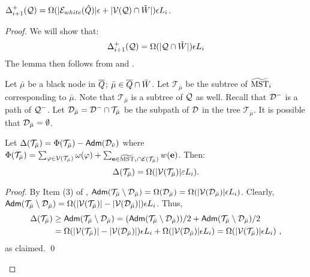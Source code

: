 \begin{lemma} $	\Delta^+_{i+1}(\mathcal{Q}) =  \Omega(|\mathcal{E}_{white}(\hat{Q})|\epsilon + |\mathcal{V}(\mathcal{Q})\cap \tilde{W}|)\epsilon L_i$.
\end{lemma}
\begin{proof} We will show that:
	 \begin{equation}\label{eq:blacknodes-C}
	 \Delta^+_{i+1}(\mathcal{Q}) =  \Omega(|\mathcal{Q} \cap \tilde{W}|) \epsilon L_i
	 \end{equation}
	 The lemma then follows from  and .
	 
	 Let $\bar{\mu}$ be a black node in $\overline{Q}$; $\bar{\mu}\in \overline{Q}\cap \bar{W}$. Let $\mathcal{T}_{\bar{\mu}}$ be the subtree of $\widetilde{\mathrm{MST}}_{i}$ corresponding to $\bar{\mu}$. Note that $\mathcal{T}_{\bar{\mu}}$ is a subtree of $\mathcal{Q}$ as well. Recall that $\mathcal{D}^-$ is a path of  $\mathcal{Q}^-$. Let $\mathcal{D}_{\bar{\mu}} = \mathcal{D}^{-} \cap \mathcal{T}_{\bar{\mu}}$ be the subpath of $\mathcal{D}$ in the tree $\mathcal{T}_{\bar{\mu}}$. It is possible that $\mathcal{D}_{\bar{\mu}} = \emptyset$. 
	 \begin{claim}\label{clm:Tmu-delta} Let $\Delta(\mathcal{T}_{\bar{\mu}}) = \Phi(\mathcal{T}_{\bar{\mu}}) - \mathsf{Adm}(\mathcal{D}_{\bar{\nu}})$ where $\Phi(\mathcal{T}_{\bar{\mu}})  = \sum_{\varphi \in \mathcal{V}(\mathcal{T}_{\bar{\mu}})}\omega(\varphi) + \sum_{\mathbf{e} \in \widetilde{\mathrm{MST}}_i\cap \mathcal{E}(\mathcal{T}_{\bar{\mu}})}w(\mathbf{e})$. Then:
	 	$$\Delta(\mathcal{T}_{\bar{\mu}}) = \Omega(| \mathcal{V}(\mathcal{T}_{\bar{\mu}})|\varepsilon L_i).$$
	 \end{claim}
 	\begin{proof}
 		By Item (3) of ,  $\mathsf{Adm}(\mathcal{T}_{\bar{\mu}} \setminus \mathcal{D}_{\bar{\mu}}) = \Omega( \mathcal{D}_{\bar{\mu}}) = \Omega(|\mathcal{V}(\mathcal{D}_{\bar{\mu}})|\epsilon L_i)$. Clearly, $\mathsf{Adm}(\mathcal{T}_{\bar{\mu}} \setminus \mathcal{D}_{\bar{\mu}}) = \Omega(|\mathcal{V}(\mathcal{T}_{\bar{\mu}})| - |\mathcal{V}(\mathcal{D}_{\bar{\mu}})|)\epsilon L_i$.  Thus, 
 		\begin{equation*}
 			\begin{split}
 			\Delta(\mathcal{T}_{\bar{\mu}}) &\geq \mathsf{Adm}(\mathcal{T}_{\bar{\mu}} \setminus \mathcal{D}_{\bar{\mu}}) = (\mathsf{Adm}(\mathcal{T}_{\bar{\mu}} \setminus \mathcal{D}_{\bar{\mu}}))/2 +  \mathsf{Adm}(\mathcal{T}_{\bar{\mu}} \setminus \mathcal{D}_{\bar{\mu}})/2\\
 			& =  \Omega(|\mathcal{V}(\mathcal{T}_{\bar{\mu}})| - |\mathcal{V}(\mathcal{D}_{\bar{\mu}})|)\epsilon L_i + \Omega(|\mathcal{V}(\mathcal{D}_{\bar{\mu}})|\epsilon L_i)=   \Omega(|\mathcal{V}(\mathcal{T}_{\bar{\mu}})|\epsilon L_i)~,
 			\end{split}
 		\end{equation*}
 	as claimed. \qed
 	\end{proof}
	 

\end{proof}
